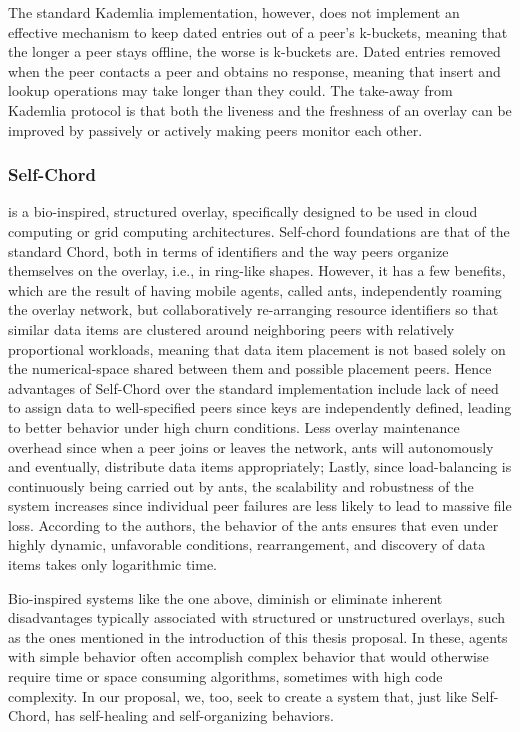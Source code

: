 \documentclass[runningheads]{llncs}
\begin{document}
The standard Kademlia implementation, however, does not implement an effective mechanism to keep dated entries out of a peer's k-buckets, meaning that the longer a peer stays offline, the worse is k-buckets are. Dated entries removed when the peer contacts a peer and obtains no response, meaning that insert and lookup operations may take longer than they could. The take-away from Kademlia protocol is that both the liveness and the freshness of an overlay can be improved by passively or actively making peers monitor each other.\newline

\subsubsection{Self-Chord} \cite{selfchord} is a bio-inspired, structured overlay, specifically designed to be used in cloud computing or grid computing architectures. Self-chord foundations are that of the standard Chord, both in terms of identifiers and the way peers organize themselves on the overlay, i.e., in ring-like shapes. However, it has a few benefits, which are the result of having mobile agents, called ants, independently roaming the overlay network, but collaboratively re-arranging resource identifiers so that similar data items are clustered around neighboring peers with relatively proportional workloads, meaning that data item placement is not based solely on the numerical-space shared between them and possible placement peers. Hence advantages of Self-Chord over the standard implementation include lack of need to assign data to well-specified peers since keys are independently defined, leading to better behavior under high churn conditions. Less overlay maintenance overhead since when a peer joins or leaves the network, ants will autonomously and eventually, distribute data items appropriately; Lastly, since load-balancing is continuously being carried out by ants, the scalability and robustness of the system increases since individual peer failures are less likely to lead to massive file loss. According to the authors, the behavior of the ants ensures that even under highly dynamic, unfavorable conditions, rearrangement, and discovery of data items takes only logarithmic time.

Bio-inspired systems like the one above, diminish or eliminate inherent disadvantages typically associated with structured or unstructured overlays, such as the ones mentioned in the introduction of this thesis proposal. In these, agents with simple behavior often accomplish complex behavior that would otherwise require time or space consuming algorithms, sometimes with high code complexity. In our proposal, we, too, seek to create a system that, just like Self-Chord, has self-healing and self-organizing behaviors.
\end{document}

